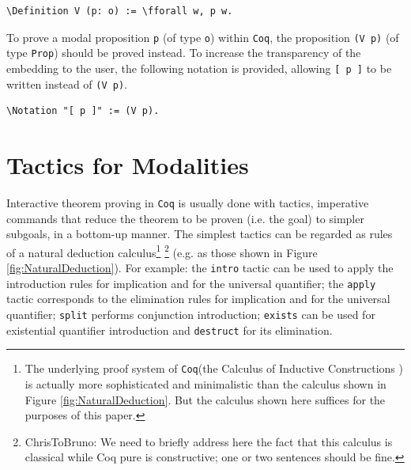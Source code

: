\documentclass{llncs}
\newcommand{\red}[1]{\textcolor[rgb]{1,0,0}{#1}}
\newcommand{\blue}[1]{\textcolor[rgb]{0,0,1}{#1}}
\newcommand{\Definition}{\red{Definition}}
\newcommand{\Notation}{\blue{Notation}}
\newcommand{\fforall}{\blue{forall}}
\newcommand{\Coq}{\texttt{Coq}\xspace}
\begin{document}
\begin{Verbatim}[commandchars=\\\{\},fontsize=\verbsize]
\Definition V (p: o) := \fforall w, p w.
\end{Verbatim}

\noindent 
To prove a modal proposition \texttt{p} (of type \texttt{o})
within \Coq, the proposition \texttt{(V p)} (of type \texttt{Prop})
should be proved instead. To increase the transparency of the
embedding to the user, the following notation is provided, allowing
\texttt{[ p ]} to be written instead of \texttt{(V p)}.

\begin{Verbatim}[commandchars=\\\{\},fontsize=\verbsize]
\Notation "[ p ]" := (V p).
\end{Verbatim}



\section{Tactics for Modalities}
\label{sec:Tactics}

Interactive theorem proving in \Coq is usually done with tactics,
imperative commands that reduce the theorem to be proven (i.e. the
goal) to simpler subgoals, in a bottom-up manner. The simplest tactics
can be regarded as rules of a natural deduction calculus\footnote{The
underlying proof system of \Coq (the Calculus of Inductive
Constructions \cite{Paulin}) is actually more sophisticated and
minimalistic than the calculus shown in Figure
\ref{fig:NaturalDeduction}. But the calculus shown here suffices for
the purposes of this paper.} \footnote{ChrisToBruno: We need to briefly address here
    the fact that this calculus is classical while Coq pure is
    constructive; one or two sentences should be fine.} 
(e.g. as those shown in Figure
\ref{fig:NaturalDeduction}).  For example: the \texttt{intro} tactic
can be used to apply the introduction rules for implication and for
the universal quantifier; the \texttt{apply} tactic corresponds to the
elimination rules for implication and for the universal quantifier;
\texttt{split} performs conjunction introduction; \texttt{exists} can
be used for existential quantifier introduction and \texttt{destruct}
for its elimination.


\newcommand{\s}{\qquad}
\end{document}
